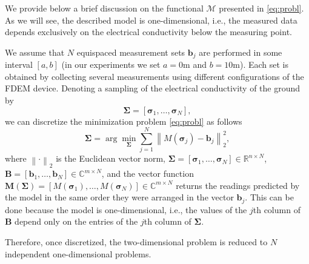 \documentclass[final,leqno]{siamltex}
\newcommand{\R}{{\mathbb R}}
\newcommand{\norm}[1]{\left\| #1 \right\|}
\newcommand{\sigmab}{\boldsymbol{\sigma}}
\newcommand{\C}{{\mathbb{C}}}
\newcommand{\Sigmab}{\mathbf{\Sigma}}
\begin{document}
We provide below a brief discussion on the functional $\mathcal{M}$ presented in \eqref{eq:probl}. As we will see, the described model is one-dimensional, i.e., the measured data depends exclusively on the electrical conductivity below the measuring point. 

We assume that $N$ equispaced measurement sets $\mathbf{b}_j$ are performed in some interval $[a,b]$ (in our experiments we set $a=0$m and $b=10$m). Each set is obtained by collecting several measurements using different configurations of the FDEM device. Denoting a sampling of the electrical conductivity of the ground by
$$
\Sigmab=[\sigmab_1,\ldots,\sigmab_N],
$$
we can discretize the minimization problem \eqref{eq:probl} as follows
\begin{equation}\label{eq:model_decoupled}
\Sigmab=\arg\min_{\Sigmab}\sum_{j=1}^{N}\norm{M(\sigmab_j)-\mathbf{b}_j}_2^2,
\end{equation}
where $\norm{\cdot}_2$ is the Euclidean vector norm, $\boldsymbol{\Sigma}=[\sigmab_1,\ldots,\sigmab_N]\in\R^{n\times N}$, $\mathbf{B}=[\mathbf{b}_1,\ldots,\mathbf{b}_N]\in\C^{m\times N}$, and the vector function $\mathbf{M}(\Sigmab)=[M(\sigmab_1), \ldots,M(\sigmab_N)] \in \C^{m\times N}$ returns the readings predicted by the model in the same order they were arranged in the vector $\mathbf{b}_j$. This can be done because the model is one-dimensional, i.e., the values of the $j$th column of $\mathbf{B}$ depend only on the entries of the $j$th column of $\Sigmab$.

Therefore, once discretized, the two-dimensional problem is reduced to $N$ independent one-dimensional problems.
\end{document}
